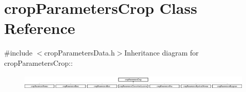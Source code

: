 \hypertarget{classcrop_parameters_crop}{
\section{cropParametersCrop Class Reference}
\label{classcrop_parameters_crop}
}


{\ttfamily \#include $<$cropParametersData.h$>$}Inheritance diagram for cropParametersCrop::\begin{figure}[H]
\begin{center}
\leavevmode
\includegraphics[height=0.733945cm]{classcrop_parameters_crop}
\end{center}
\end{figure}
